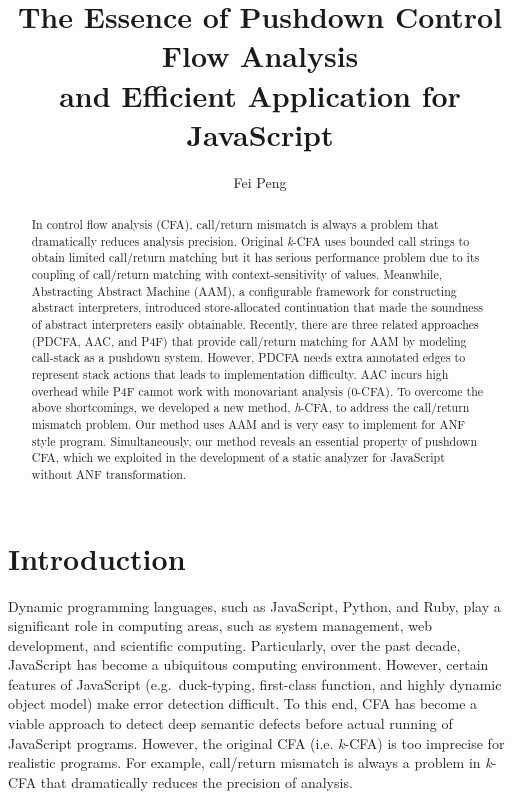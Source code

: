 \documentclass{article}
\title{The Essence of Pushdown Control Flow Analysis \\ and Efficient Application for JavaScript}
\author{Fei Peng}
\begin{document}
\maketitle
\begin{abstract}
In control flow analysis (CFA), call/return mismatch is always a problem that dramatically reduces analysis precision. Original \textit{k}-CFA uses bounded call strings to obtain limited call/return matching but it has serious performance problem
due to its coupling of call/return matching with context-sensitivity of values.
Meanwhile, Abstracting Abstract Machine (AAM), a configurable framework for constructing abstract interpreters,
introduced store-allocated continuation that made the soundness of abstract interpreters easily obtainable.
Recently, there are three related approaches (PDCFA, AAC, and P4F) that provide call/return matching for AAM by modeling call-stack as a pushdown system.
However, PDCFA needs extra annotated edges to represent stack actions that leads to implementation difficulty.
AAC incurs high overhead while P4F cannot work with monovariant analysis (0-CFA).
To overcome the above shortcomings, we developed a new method, \textit{h}-CFA, to address the call/return mismatch problem.
Our method uses AAM and is very easy to implement for ANF style program.
Simultaneously, our method reveals an essential property of pushdown CFA,
which we exploited in the development of a static analyzer for JavaScript without ANF transformation.
\end{abstract}

\section{Introduction}
\label{Introduction}
Dynamic programming languages, such as JavaScript, Python, and Ruby, play a significant role in computing areas, such as system management, web development, and scientific computing.
Particularly, over the past decade, JavaScript has become a ubiquitous computing environment.
However, certain features of JavaScript (e.g.\ duck-typing, first-class function, and highly dynamic object model) make error detection difficult.
To this end, CFA has become a viable approach to detect deep semantic defects before actual running of JavaScript programs.
However, the original CFA (i.e. \textit{k}-CFA) is too imprecise for realistic programs.
For example, call/return mismatch is always a problem in \textit{k}-CFA that dramatically reduces the precision of analysis.
\end{document}
